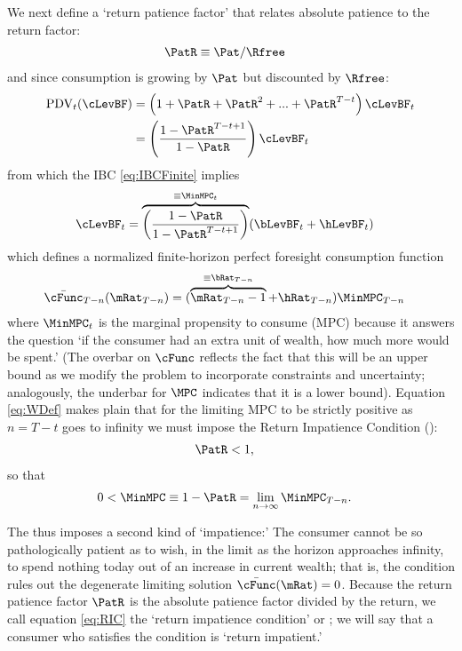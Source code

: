 \documentclass[BufferStockTheory]{subfiles}
\begin{document}
We next define a `return patience factor' that relates absolute patience to the return factor:
\begin{align}
  \PatR  & \equiv  {\Pat}/\Rfree \label{eq:PatR}
\end{align}
and since consumption is growing by $\Pat$ but discounted by $\Rfree$:
\begin{align}
  \text{PDV}_{t}(\cLevBF)  & = \left(1+\PatR+\PatR^{2}+...+ \PatR^{T-t}\right)\cLevBF_{t} \notag
  \\  & = \left(\frac{1-\PatR^{T-t+1}}{1-\PatR}\right)\cLevBF_{t}
\end{align}
from which the IBC \eqref{eq:IBCFinite} implies
\begin{align}
  \cLevBF_{t}  & = \overbrace{\left(\frac{1-\PatR}{1-\PatR^{T-t+1}}\right)}^{\equiv \MinMPC_{t}}
                 (\bLevBF_{t}+\hLevBF_{t})   \label{eq:WDef}
\end{align}
which defines a normalized finite-horizon perfect foresight consumption function
\begin{align}
  \bar{\cFunc}_{T-n}(\mRat_{T-n})  & = (\overbrace{\mRat_{T-n}-1}^{
                                     \equiv\bRat_{T-n}}+\hRat_{T-n})\MinMPC_{T-n}
\end{align}
where $\MinMPC_{t}$ is the marginal propensity to consume (MPC) because it answers the
question `if the consumer had an extra unit of wealth, how much more would be spent.' \hypertarget{RIC}{}
(The overbar on $\cFunc$ reflects the fact that this will be an upper bound as we modify the problem to incorporate constraints and uncertainty; analogously, the underbar for $\MPC$ indicates that it is a lower bound).
Equation \eqref{eq:WDef} makes plain that for the limiting
MPC to be strictly positive as $n=T-t$ goes to infinity we must impose the Return Impatience Condition (\RIC):
\begin{align}
  \PatR  & < 1   \label{eq:RIC},
\end{align}
so that
\begin{align}
  0 <  \MinMPC  & \equiv   1-\PatR = \lim_{n \rightarrow \infty} \MinMPC_{T-n} \label{eq:MinMPCDef}
                  .
\end{align}


The {\RIC} thus imposes a second kind of `impatience:' The consumer cannot be so pathologically patient as to wish, in the limit as the horizon approaches infinity, to spend nothing today out of an increase in current wealth; that is, the condition rules out the degenerate limiting solution $\bar{\cFunc}(\mRat)=0$.  Because the return patience factor $\PatR$ is the absolute patience factor divided by the return, we call equation \eqref{eq:RIC} the `return impatience condition' or \RIC; we will say that a consumer who satisfies the condition is `return impatient.'
\end{document}
